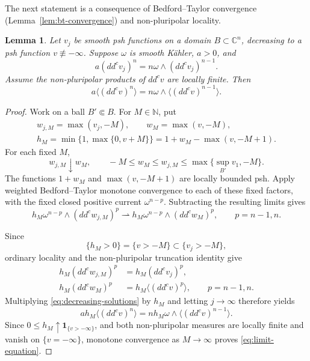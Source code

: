 \documentclass[reqno]{amsart}
\numberwithin{equation}{section}
\newtheorem{lemma}[theorem]{Lemma}
\theoremstyle{definition}
\begin{document}
The next statement is a consequence of
Bedford--Taylor convergence (Lemma~\ref{lem:bt-convergence})
and non-pluripolar locality.
\begin{lemma}\label{lem:scalar-limit}
Let $v_j$ be smooth psh functions on a domain $B\subset\mathbb C^n$, decreasing to a psh function $v\not\equiv-\infty$. Suppose $\omega$ is smooth K\"ahler, $a>0$, and
\begin{equation}\label{eq:decreasing-solutions}
a(dd^cv_j)^n=n\omega\wedge(dd^cv_j)^{n-1}.
\end{equation}
Assume the non-pluripolar products of $dd^cv$ are locally finite.  Then \begin{equation}\label{eq:limit-equation}
a\langle(dd^cv)^n\rangle
=n\omega\wedge\langle(dd^cv)^{n-1}\rangle.
\end{equation}
\end{lemma}
\begin{proof}

Work on a ball $B'\Subset B$. For $M\in\mathbb N$, put
\[
\begin{gathered}
w_{j,M}=\max(v_j,-M),\qquad w_M=\max(v,-M),\\
h_M=\min\{1,\max\{0,v+M\}\}
   =1+w_M-\max(v,-M+1).
\end{gathered}
\]
For each fixed $M$,
\[
w_{j,M}\downarrow w_M,\qquad
-M\le w_M\le w_{j,M}\le\max\{\sup_{B'}v_1,-M\}.
\]
The functions $1+w_M$ and $\max(v,-M+1)$ are locally
bounded psh. Apply weighted Bedford--Taylor monotone convergence
\cite[III, Theorem 3.7(a), p.~147]{D12} to each of these
fixed factors, with the fixed closed positive current
$\omega^{n-p}$. Subtracting the resulting limits gives
\[
h_M\omega^{n-p}\wedge(dd^cw_{j,M})^p
\rightharpoonup h_M\omega^{n-p}\wedge(dd^cw_M)^p,
\qquad p=n-1,n.
\]

Since
\[
\{h_M>0\}=\{v>-M\}\subset\{v_j>-M\},
\]
ordinary locality and the non-pluripolar truncation identity
\cite[Definition 1.1 and Proposition 1.4]{BEGZ10} give
\[
\begin{aligned}
h_M(dd^cw_{j,M})^p&=h_M(dd^cv_j)^p,\\
h_M(dd^cw_M)^p&=h_M\langle(dd^cv)^p\rangle,
\qquad p=n-1,n.
\end{aligned}
\]
Multiplying \eqref{eq:decreasing-solutions} by $h_M$
and letting $j\to\infty$ therefore yields
\[
a h_M\langle(dd^cv)^n\rangle
=n h_M\omega\wedge\langle(dd^cv)^{n-1}\rangle.
\]
Since $0\le h_M\uparrow\mathbf1_{\{v>-\infty\}}$, and both
non-pluripolar measures are locally finite and vanish on
$\{v=-\infty\}$, monotone convergence as $M\to\infty$
proves \eqref{eq:limit-equation}.\qedhere
\end{proof}
\end{document}
